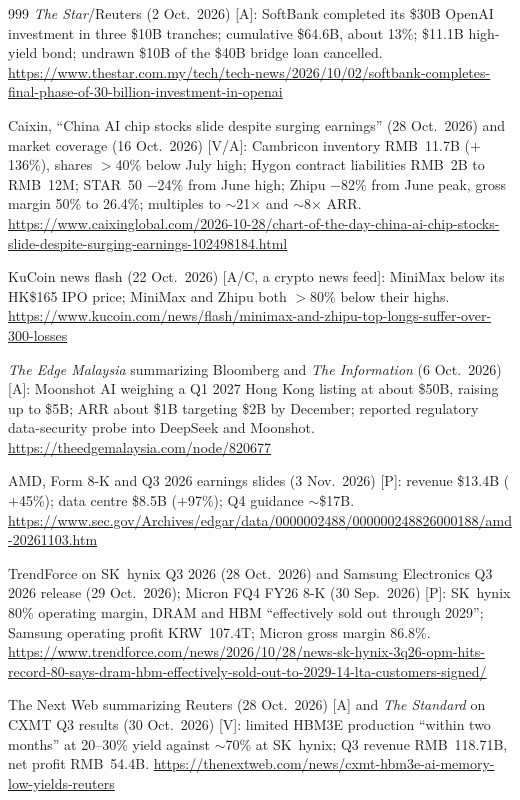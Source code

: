 \begin{thebibliography}{999}
 \emph{The Star}/Reuters (2 Oct.\ 2026) [A]: SoftBank completed its \$30B OpenAI investment in three \$10B tranches; cumulative \$64.6B, about 13\%; \$11.1B high-yield bond; undrawn \$10B of the \$40B bridge loan cancelled. \url{https://www.thestar.com.my/tech/tech-news/2026/10/02/softbank-completes-final-phase-of-30-billion-investment-in-openai}

 Caixin, ``China AI chip stocks slide despite surging earnings'' (28 Oct.\ 2026) and market coverage (16 Oct.\ 2026) [V/A]: Cambricon inventory RMB~11.7B ($+$136\%), shares $>$40\% below July high; Hygon contract liabilities RMB~2B to RMB~12M; STAR~50 $-$24\% from June high; Zhipu $-$82\% from June peak, gross margin 50\% to 26.4\%; multiples to $\sim$21$\times$ and $\sim$8$\times$ ARR. \url{https://www.caixinglobal.com/2026-10-28/chart-of-the-day-china-ai-chip-stocks-slide-despite-surging-earnings-102498184.html}

 KuCoin news flash (22 Oct.\ 2026) [A/C, a crypto news feed]: MiniMax below its HK\$165 IPO price; MiniMax and Zhipu both $>$80\% below their highs. \url{https://www.kucoin.com/news/flash/minimax-and-zhipu-top-longs-suffer-over-300-losses}

 \emph{The Edge Malaysia} summarizing Bloomberg and \emph{The Information} (6 Oct.\ 2026) [A]: Moonshot AI weighing a Q1 2027 Hong Kong listing at about \$50B, raising up to \$5B; ARR about \$1B targeting \$2B by December; reported regulatory data-security probe into DeepSeek and Moonshot. \url{https://theedgemalaysia.com/node/820677}

 AMD, Form 8-K and Q3 2026 earnings slides (3 Nov.\ 2026) [P]: revenue \$13.4B ($+$45\%); data centre \$8.5B ($+$97\%); Q4 guidance $\sim$\$17B. \url{https://www.sec.gov/Archives/edgar/data/0000002488/000000248826000188/amd-20261103.htm}

 TrendForce on SK~hynix Q3 2026 (28 Oct.\ 2026) and Samsung Electronics Q3 2026 release (29 Oct.\ 2026); Micron FQ4 FY26 8-K (30 Sep.\ 2026) [P]: SK~hynix 80\% operating margin, DRAM and HBM ``effectively sold out through 2029''; Samsung operating profit KRW~107.4T; Micron gross margin 86.8\%. \url{https://www.trendforce.com/news/2026/10/28/news-sk-hynix-3q26-opm-hits-record-80-says-dram-hbm-effectively-sold-out-to-2029-14-lta-customers-signed/}

 The Next Web summarizing Reuters (28 Oct.\ 2026) [A] and \emph{The Standard} on CXMT Q3 results (30 Oct.\ 2026) [V]: limited HBM3E production ``within two months'' at 20--30\% yield against $\sim$70\% at SK~hynix; Q3 revenue RMB~118.71B, net profit RMB~54.4B. \url{https://thenextweb.com/news/cxmt-hbm3e-ai-memory-low-yields-reuters}


\end{thebibliography}
